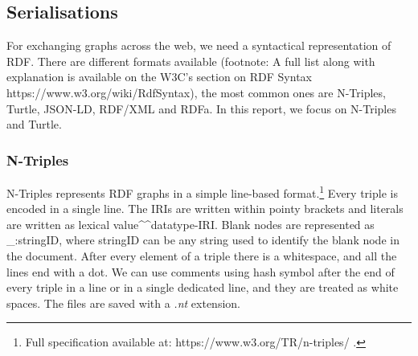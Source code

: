 

\subsection{Serialisations}
For exchanging graphs across the web, we need a syntactical representation of RDF. There are different formats available (footnote: A full list along with explanation is available on the W3C’s section on RDF Syntax https://www.w3.org/wiki/RdfSyntax), the most common ones are N-Triples, Turtle, JSON-LD, RDF/XML and RDFa. In this report, we focus on N-Triples and Turtle.

\subsubsection{N-Triples}
N-Triples represents RDF graphs in a simple line-based format.\footnote{Full specification available at: https://www.w3.org/TR/n-triples/ .} Every triple is encoded in a single line. The IRIs are written within pointy brackets and literals are written as lexical value\textasciicircum \textasciicircum datatype-IRI. Blank nodes are represented as \_:stringID, where stringID can be any string used to identify the blank node in the document. After every element of a triple there is a whitespace, and all the lines end with a dot. We can use comments using hash symbol after the end of every triple in a line or in a single dedicated line, and they are treated as white spaces. The files are saved with a \textit{.nt} extension.

